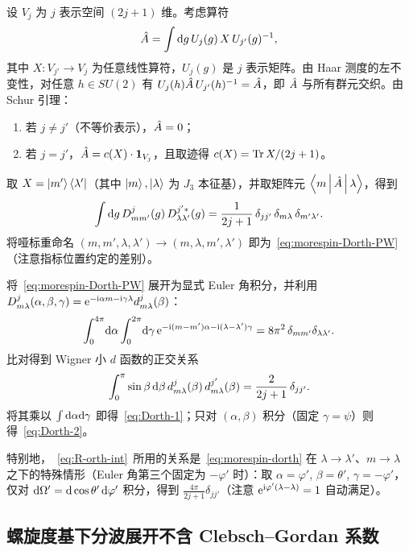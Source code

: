 \begin{proof*}
设 $V_j$ 为 $j$ 表示空间 $(2j+1)$ 维。考虑算符
$$
\hat{A}=\int \mathrm{d} g\, U_j(g)\,X\,U_{j'}(g)^{-1},
$$
其中 $X:V_{j'}\to V_j$ 为任意线性算符，$U_j(g)$ 是 $j$ 表示矩阵。由 Haar 测度的左不变性，对任意 $h\in SU(2)$ 有 $U_j(h)\hat{A}\,U_{j'}(h)^{-1}=\hat{A}$，即 $\hat{A}$ 与所有群元交织。由 Schur 引理：
\begin{enumerate}
\item 若 $j\neq j'$（不等价表示），$\hat{A}=0$；
\item 若 $j=j'$，$\hat{A}=c(X)\cdot\mathbf{1}_{V_j}$，且取迹得 $c(X)=\operatorname{Tr} X/(2j+1)$。
\end{enumerate}
取 $X=\ket{m'}\bra{\lambda'}$（其中 $\ket{m},\ket{\lambda}$ 为 $J_3$ 本征基），并取矩阵元 $\left\langle m \,\middle|\, \hat{A} \,\middle|\, \lambda \right\rangle$，得到
$$
\int \mathrm{d} g\,D^{j}_{m m'}(g)\,D^{j'*}_{\lambda \lambda'}(g)
=\frac{1}{2j+1}\,\delta_{jj'}\,\delta_{m\lambda}\,\delta_{m'\lambda'}.
$$
将哑标重命名 $(m,m',\lambda,\lambda')\to(m,\lambda,m',\lambda')$ 即为~\eqref{eq:morespin-Dorth-PW}（注意指标位置约定的差别）。

将~\eqref{eq:morespin-Dorth-PW} 展开为显式 Euler 角积分，并利用 $D^{j}_{m\lambda}(\alpha,\beta,\gamma)=\mathrm{e}^{-\mathrm{i}\alpha m-\mathrm{i}\gamma\lambda}d^{j}_{m\lambda}(\beta)$：
\begin{align*}
\int_0^{4\pi}\!\mathrm{d}\alpha\int_0^{2\pi}\!\mathrm{d}\gamma\,\mathrm{e}^{-\mathrm{i}(m-m')\alpha-\mathrm{i}(\lambda-\lambda')\gamma}=8\pi^2\,\delta_{mm'}\delta_{\lambda\lambda'}.
\end{align*}
比对得到 Wigner 小 $d$ 函数的正交关系
\begin{equation}
\int_0^\pi \sin\beta\,\mathrm{d}\beta\, d^{j}_{m\lambda}(\beta)\,d^{j'}_{m\lambda}(\beta)=\frac{2}{2j+1}\,\delta_{jj'}.
\label{eq:morespin-dorth}
\end{equation}
将其乘以 $\int\mathrm{d}\alpha\mathrm{d}\gamma$ 即得~\eqref{eq:Dorth-1}；只对 $(\alpha,\beta)$ 积分（固定 $\gamma=\psi$）则得~\eqref{eq:Dorth-2}。

特别地，~\eqref{eq:R-orth-int}~所用的关系是~\eqref{eq:morespin-dorth} 在 $\lambda\to\lambda'$、$m\to\lambda$ 之下的特殊情形（Euler 角第三个固定为 $-\varphi'$ 时）：取 $\alpha=\varphi'$, $\beta=\theta'$, $\gamma=-\varphi'$，仅对 $\mathrm{d}\Omega'=\mathrm{d}\cos\theta'\,\mathrm{d}\varphi'$ 积分，得到 $\frac{4\pi}{2j+1}\delta_{jj'}$（注意 $\mathrm{e}^{\mathrm{i}\varphi'(\lambda-\lambda)}=1$ 自动满足）。
\end{proof*}

\subsection{螺旋度基下分波展开不含 Clebsch--Gordan 系数}
\label{subsec:morespin-noCG}

